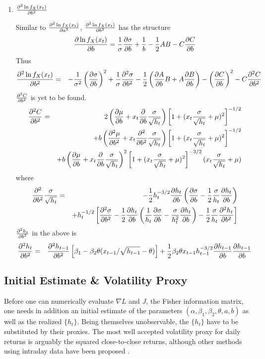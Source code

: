 \documentclass{book}
\begin{document}
\begin{enumerate}
\item $\frac{\partial^2 \ln f_X(x_t)}{\partial b^2}$

  Similar to $\frac{\partial^2 \ln f_X(x_t)}{\partial a^2}$, $\frac{\partial^2 \ln f_X(x_t)}{\partial b^2}$ has the
  structure
  \begin{equation*}
    \frac{\partial \ln f_X(x_t)}{\partial b} = {1 \over \sigma}\frac{\partial \sigma}{\partial b} + {1 \over b}
    -{1 \over 2} AB - C \frac{\partial C}{\partial b}
  \end{equation*}
  Thus
  \begin{eqnarray*}
    \frac{\partial^2 \ln f_X(x_t)}{\partial b^2} &=& -{1 \over \sigma^2} \left(
      \frac{\partial \sigma}{\partial b} \right)^2 + {1 \over \sigma} \frac{\partial^2 \sigma}{\partial b^2}
    -{1 \over 2} \left(
      \frac{\partial A}{\partial b} B + A \frac{\partial B}{\partial b}
    \right) - \left( \frac{\partial C}{\partial b} \right)^2 - C \frac{\partial^2 C}{\partial b^2}
  \end{eqnarray*}
  $\frac{\partial^2 C}{\partial b^2}$ is yet to be found.
  \begin{eqnarray*}
    \frac{\partial^2 C}{\partial b^2} &=&
    2 \left(
      \frac{\partial \mu}{\partial b} + x_t \frac{\partial}{\partial b} {\sigma \over \sqrt{h_t}}
    \right) \left[
      1 + (x_t {\sigma \over \sqrt{h_t}} + \mu)^2
    \right]^{-1/2} \\
    &&
    + b \left(
      \frac{\partial^2 \mu}{\partial b^2} + x_t \frac{\partial^2}{\partial b^2} {\sigma \over \sqrt{h_t}}
    \right) \left[
      1 + (x_t {\sigma \over \sqrt{h_t}} + \mu)^2
    \right]^{-1/2} \\
    &&
    + b \left( \frac{\partial \mu}{\partial b} + x_t \frac{\partial}{\partial b} {\sigma \over \sqrt{h_t}} \right)^2
    \left[ 1 + (x_t {\sigma \over \sqrt{h_t}} + \mu)^2 \right]^{-3/2}
    (x_t {\sigma \over \sqrt{h_t}} + \mu)
  \end{eqnarray*}
  where
  \begin{eqnarray*}
    \frac{\partial^2}{\partial b^2} {\sigma \over \sqrt{h_t}} &=& -{1 \over 2}h_t^{-3/2} \frac{\partial h_t}{\partial b} \left(
      \frac{\partial \sigma}{\partial b} - {1 \over 2}{\sigma \over h_t}\frac{\partial h_t}{\partial b}
    \right) \\
    && + h_t^{-1/2} \left[
      \frac{\partial^2 \sigma}{\partial b^2} - {1 \over 2} \frac{\partial h_t}{\partial b} \left(
        {1 \over h_t} \frac{\partial \sigma}{\partial b} - {\sigma \over h_t^2} \frac{\partial h_t}{\partial b}
        \right) - {1 \over 2} {\sigma \over h_t} \frac{\partial^2 h_t}{\partial b^2}
    \right]
  \end{eqnarray*}
  $\frac{\partial^2 h_t}{\partial b^2}$ in the above is
  \begin{eqnarray*}
    \frac{\partial^2 h_t}{\partial b^2} &=&
    \frac{\partial^2 h_{t-1}}{\partial b^2} \left[
      \beta_1 - \beta_2 \theta (x_{t-1}/\sqrt{h_{t-1}} - \theta)
    \right] + {1 \over 2} \beta_2 \theta x_{t-1} h_{t-1}^{-3/2}
    \frac{\partial h_{t-1}}{\partial b} \frac{\partial h_{t-1}}{\partial b}
  \end{eqnarray*}
\end{enumerate}

\subsection{Initial Estimate \& Volatility Proxy}
Before one can numerically evaluate $\nabla L$ and $J$, the Fisher
information matrix, one needs in addition an initial estimate of the
parameters $(\alpha, \beta_1, \beta_2, \theta, a, b)$ as well as
the realized $\{h_t\}$. Being themselves unobservable, the $\{h_t\}$
have to be substituted by their proxies. The most well accepted
volatility proxy for daily returns is arguably the squared
close-to-close returns, although other methods using intraday data
have been proposed \cite{Vilder2007}.
\end{document}
